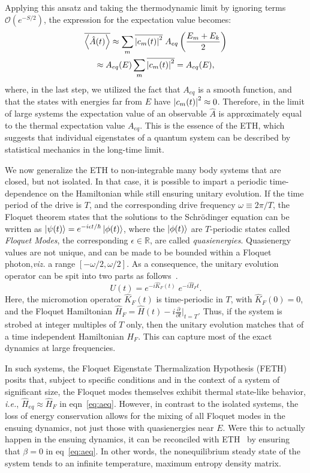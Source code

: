 \documentclass[%
reprint,
superscriptaddress,
amsmath,amssymb,
aps,
prb,
showkeys,
]{revtex4-2}
\begin{document}
Applying this ansatz and taking the thermodynamic limit by ignoring terms $\mathcal{O}(e^{-S/2})$, the expression for the expectation value becomes:
\begin{multline*}
\overline{\expval{\hat{A}(t)}} \approx \sum_m \overline{\abs{c_m(t)}^2}\; {A}_{eq}\left(\frac{E_m+E_k}{2}\right)\\
 \approx {A}_{eq}(E)\sum_m \overline{\abs{c_m(t)}^2} = A_{eq}(E),
\end{multline*}
where, in the last step, we utilized the fact that $A_{eq}$ is a smooth function, and that the states with energies far from $E$ have $\abs{c_m(t)}^2\approx 0$. Therefore, in the limit of large systems the expectation value of an observable $\hat{A}$ is approximately equal to the thermal expectation value $A_{eq}$. This is the essence of the ETH, which suggests that individual eigenstates of a quantum system can be described by statistical mechanics in the long-time limit.

We now generalize the ETH to non-integrable many body systems that are closed, but not isolated. In that case, it is possible to impart a periodic time-dependence on the Hamiltonian while still ensuring unitary evolution. If the time period of the drive is $T$, and the corresponding drive frequency $\omega\equiv 2\pi/T$, the Floquet theorem states that the solutions to the Schrödinger equation can be written as $\ket{\psi(t)} = e^{-i\epsilon t/\hbar} \ket{\phi(t)}$, where the $\ket{\phi(t)}$ are $T$-periodic states called \textit{Floquet Modes}, the corresponding $\epsilon\in \mathbb{R}$, are called \textit{quasienergies}. Quasienergy values are not unique, and can be made to be bounded within a Floquet photon,\textit{viz.} a range $[-\omega/2, \omega/2]$\cite{holthaus_floquet_2016,vogl_effective_2020}. As a consequence, the unitary evolution operator can be spit into two parts as follows~\cite{Bukov2014}.
\begin{equation}
	\label{eq:propagator}
	U(t) = e^{-i\hat{K}_F(t)}\;e^{-i\hat{H}_Ft}.
\end{equation}
Here, the micromotion operator $\hat{K}_F(t)$ is time-periodic in $T$, with $\hat{K}_F(0)=0$, and the Floquet Hamiltonian $\hat{H}_F = \hat{H}(t) - i \displaystyle\frac{\partial}{\partial t}\bigg\vert_{t=T}$. Thus, if the system is strobed at integer multiples of $T$ only, then the unitary evolution matches that of a time independent Hamiltonian $H_F$. This can capture most of the exact dynamics at large frequencies.

In such systems, the Floquet Eigenstate Thermalization Hypothesis (FETH) posits that, subject to specific conditions and in the context of a system of significant size, the Floquet modes themselves exhibit thermal state-like behavior, \textit{i.e.}, $\hat{H}_{eq}\approx \hat{H}_F$ in eqn~\ref{eq:aeq}. However, in contrast to the isolated systems, the loss of energy conservation allows for the mixing of all Floquet modes in the ensuing dynamics, not just those with quasienergies near $E$. Were this to actually happen in the ensuing dynamics, it can be reconciled with ETH~\cite{alessio} by ensuring that $\beta=0$ in eq~\ref{eq:aeq}. In other words, the nonequilibrium steady state of the system tends to an infinite temperature, maximum entropy density matrix.
\end{document}
